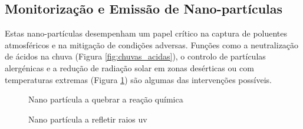 \documentclass[a4paper, 11pt, onecolumn, oneside]{report}
\begin{document}
\subsection{Monitorização e Emissão de Nano-partículas}
Estas nano-partículas desempenham um papel crítico na captura de poluentes atmosféricos e na mitigação de condições adversas. Funções como a neutralização de ácidos na chuva (Figura \ref{fig:chuvas_acidas}), o controlo de partículas alergénicas e a redução de radiação solar em zonas desérticas ou com temperaturas extremas (Figura \ref{fig:high_temperatures}) são algumas das intervenções possíveis.
\begin{figure}[ht]
    \centering
    \begin{minipage}{0.45\textwidth}
        \centering
        \caption{Nano partícula a quebrar a reação química}
        \label{fig:chuvas_acidas}
    \end{minipage}
    \hfill
    \begin{minipage}{0.45\textwidth}
        \centering
        \caption{Nano partícula a refletir raios \ac{uv}}
        \label{fig:high_temperatures}
    \end{minipage}
\end{figure}
\end{document}
